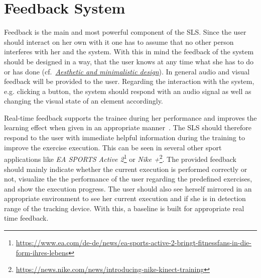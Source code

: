 \section{Feedback System}\label{4_5_feedbackSystem}



Feedback is the main and most powerful component of the SLS. Since the user should interact on her own with it one has to assume that no other person interferes with her and the system. With this in mind the feedback of the system should be designed in a way, that the user knows at any time what she has to do or has done (cf.~\textit{\hyperref[nielsenDesignPrinciples]{Aesthetic and minimalistic design}}). In general audio and visual feedback will be provided to the user. Regarding the interaction with the system, e.g. clicking a button, the system should respond with an audio signal as well as changing the visual state of an element accordingly.

Real-time feedback supports the trainee during her performance and improves the learning effect when given in an appropriate manner~\cite{Hodges2002-gb, Liebermann2002-zr, Winstein1990-to}. The SLS should therefore respond to the user with immediate helpful information during the training to improve the exercise execution. This can be seen in several other sport applications like \textit{EA SPORTS Active 2}\footnote{\url{https://www.ea.com/de-de/news/ea-sports-active-2-bringt-fitnessfans-in-die-form-ihres-lebens}} or \textit{Nike +}\footnote{\url{https://news.nike.com/news/introducing-nike-kinect-training}}. The provided feedback should mainly indicate whether the current execution is performed correctly or not, visualize the the performance of the user regarding the predefined exercises, and show the execution progress. The user should also see herself mirrored in an appropriate environment to see her current execution and if she is in detection range of the tracking device. With this, a baseline is built for appropriate real time feedback.

